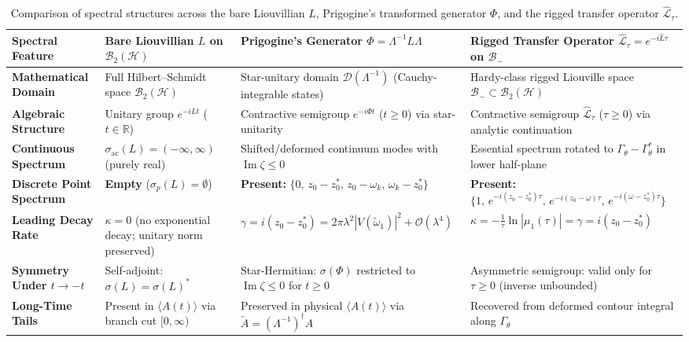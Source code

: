 \documentclass[11pt,a4paper]{article}
\begin{document}
\begin{table}[htbp]
\centering
\small
\renewcommand{\arraystretch}{1.35}
\begin{tabular}{>{\raggedright\arraybackslash}p{} >{\raggedright\arraybackslash}p{} >{\raggedright\arraybackslash}p{} >{\raggedright\arraybackslash}p{}}
\toprule
\textbf{Spectral Feature} & \textbf{Bare Liouvillian $L$ on $\mathcal{B}_2(\mathcal{H})$} & \textbf{Prigogine's Generator $\Phi = \Lambda^{-1} L \Lambda$} & \textbf{Rigged Transfer Operator $\widehat{\mathcal{L}}_\tau = e^{-i\widehat{L}\tau}$ on $\mathcal{B}_-$} \\
\midrule
\textbf{Mathematical Domain} & Full Hilbert--Schmidt space $\mathcal{B}_2(\mathcal{H})$ & Star-unitary domain $\mathcal{D}(\Lambda^{-1})$ (Cauchy-integrable states) & Hardy-class rigged Liouville space $\mathcal{B}_- \subset \mathcal{B}_2(\mathcal{H})$ \\
\textbf{Algebraic Structure} & Unitary group $e^{-iLt}$ ($t \in \mathbb{R}$) & Contractive semigroup $e^{-i\Phi t}$ ($t \ge 0$) via star-unitarity & Contractive semigroup $\widehat{\mathcal{L}}_\tau$ ($\tau \ge 0$) via analytic continuation \\
\textbf{Continuous Spectrum} & $\sigma_{\mathrm{ac}}(L) = (-\infty, \infty)$ (purely real) & Shifted/deformed continuum modes with $\operatorname{Im} \zeta \le 0$ & Essential spectrum rotated to $\Gamma_\theta - \Gamma_\theta^*$ in lower half-plane \\
\textbf{Discrete Point Spectrum} & \textbf{Empty} ($\sigma_p(L) = \emptyset$) & \textbf{Present:} $\{0, \, z_0 - z_0^*, \, z_0 - \omega_k, \, \omega_k - z_0^*\}$ & \textbf{Present:} $\{1, \, e^{-i(z_0 - z_0^*)\tau}, \, e^{-i(z_0 - \omega)\tau}, \, e^{-i(\omega - z_0^*)\tau}\}$ \\
\textbf{Leading Decay Rate} & $\kappa = 0$ (no exponential decay; unitary norm preserved) & $\gamma = i(z_0 - z_0^*) = 2\pi\lambda^2|V(\tilde{\omega}_1)|^2 + \mathcal{O}(\lambda^4)$ & $\kappa = -\frac{1}{\tau}\ln|\mu_1(\tau)| = \gamma = i(z_0 - z_0^*)$ \\
\textbf{Symmetry Under $t \to -t$} & Self-adjoint: $\sigma(L) = \sigma(L)^*$ & Star-Hermitian: $\sigma(\Phi)$ restricted to $\operatorname{Im} \zeta \le 0$ for $t \ge 0$ & Asymmetric semigroup: valid only for $\tau \ge 0$ (inverse unbounded) \\
\textbf{Long-Time Tails} & Present in $\langle A(t) \rangle$ via branch cut $[0, \infty)$ & Preserved in physical $\langle A(t) \rangle$ via $\tilde{A} = (\Lambda^{-1})^\dagger A$ & Recovered from deformed contour integral along $\Gamma_\theta$ \\
\bottomrule
\end{tabular}
\caption{Comparison of spectral structures across the bare Liouvillian $L$, Prigogine's transformed generator $\Phi$, and the rigged transfer operator $\widehat{\mathcal{L}}_\tau$.}
\end{table}
\end{document}
